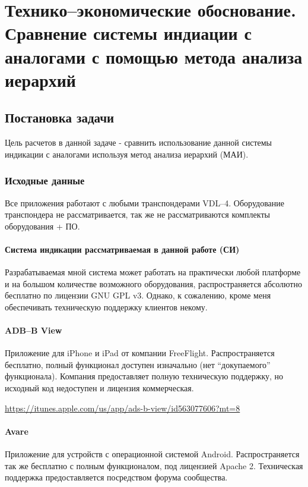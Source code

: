 \documentclass[a4paper,12pt]{report} %
\begin{document}
\chapter{Технико--экономические обоснование. Сравнение системы индиации с
  аналогами с помощью метода анализа иерархий} %
\section{Постановка задачи}

Цель расчетов в данной задаче - сравнить использование данной системы индикации
с аналогами используя метод анализа иерархий (МАИ).

\subsection{Исходные данные}

Все приложения работают с любыми транспондерами VDL--4. Оборудование транспондера
не рассматривается, так же не рассматриваются комплекты оборудования + ПО.

\subsubsection{Система индикации рассматриваемая в данной работе (СИ)}

Разрабатываемая мной система может работать на практически любой платформе и на
большом количестве возможного оборудования, распространяется абсолютно бесплатно
по лицензии GNU GPL v3. Однако, к сожалению, кроме меня обеспечивать техническую
поддержку клиентов некому.

\subsubsection{ADB--B View}

Приложение для iPhone и iPad от компании FreeFlight. Распространяется бесплатно,
полный функционал доступен изначально (нет ``докупаемого'' функционала). Компания предоставляет полную техническую
поддержку, но исходный код недоступен и лицензия коммерческая.

\url{https://itunes.apple.com/us/app/ads-b-view/id563077606?mt=8}

\subsubsection{Avare}

Приложение для устройств с операционной системой Android. Распространяется так
же бесплатно с полным функционалом, под лицензией Apache 2. Техническая
поддержка предоставляется посредством форума сообщества.
\end{document}
